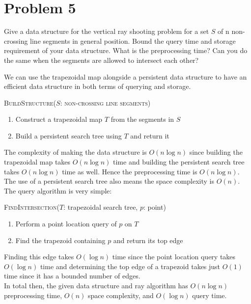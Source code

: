 \documentclass[12pt]{extarticle}
\begin{document}
\section*{Problem 5}
Give a data structure for the vertical ray shooting problem for a set $S$ of n non-crossing line segments in general position. Bound the query time and storage requirement of your data structure. What is the preprocessing time? Can you do the same when the segments are allowed to intersect each other?

\begin{solution}
    We can use the trapezoidal map alongside a persistent data structure to have an efficient data structure in both terms of querying and storage.
    \begin{algorithm}[H]
        \caption{\textsc{BuildStructure($S$: non-crossing line segments)}}
        \begin{enumerate}
            \item Construct a trapezoidal map $T$ from the segments in $S$
            \item Build a persistent search tree using $T$ and return it
        \end{enumerate}
    \end{algorithm}
    The complexity of making the data structure is $O(n \log n)$ since building the trapezoidal map takes $O(n \log n)$ time and building the persistent search tree takes $O(n \log n)$ time as well. Hence the preprocessing time is $O(n \log n)$. The use of a persistent search tree also means the space complexity is $O(n)$. The query algorithm is very simple:
    \begin{algorithm}[H]
        \caption{\textsc{FindIntersection}($T$: trapezoidal search tree, $p$: point)}
        \begin{enumerate}
            \item Perform a point location query of $p$ on $T$
            \item Find the trapezoid containing $p$ and return its top edge
        \end{enumerate}
    \end{algorithm}
    Finding this edge takes $O(\log n)$ time since the point location query takes $O(\log n)$ time and determining the top edge of a trapezoid takes just $O(1)$ time since it has a bounded number of edges.
    \\

    In total then, the given data structure and ray algorithm has $O(n \log n)$ preprocessing time, $O(n)$ space complexity, and $O(\log n)$ query time.
\end{solution}
\end{document}
